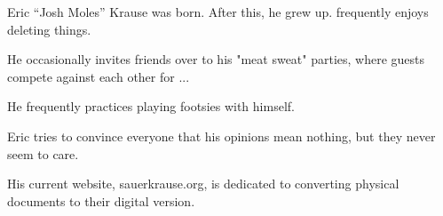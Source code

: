 \documentclass[journal]{IEEEtran}
\begin{document}
% 

\begin{IEEEbiography}{Eric ``Josh Moles'' Krause}
 was born.  After this, he grew up. 
frequently enjoys deleting things.  

He occasionally invites friends over to his "meat sweat" parties, where guests compete against each other for ... 

He frequently practices playing footsies with himself.

Eric tries to convince everyone that his opinions mean nothing, but they never seem to care. 

His current website, sauerkrause.org, is dedicated to converting physical documents to their digital version.

\end{IEEEbiography}
\end{document}
